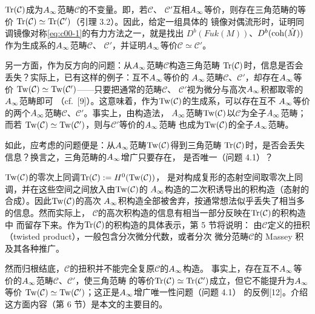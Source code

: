 $\operatorname{Tr}(\mathcal{C})$成为$A_{\infty}$范畴$\mathcal{C}$的不变量。即，若$\mathcal{C}$、
$\mathcal{C}'$互相$A_{\infty}$等价，则存在三角范畴的等价
$\operatorname{Tr}(\mathcal{C})\simeq\operatorname{Tr}(\mathcal{C}')$（引理 3.2）。因此，给定一组具体的
镜像对偶流形时，证明同调镜像对称\eqref{eq:c00-1}的有力方法之一，就是找出
$D^{b}(Fuk(M))$、$D^{b}(\operatorname{coh}(\hat{M}))$作为生成系的$A_{\infty}$范畴$\mathcal{C}$、
$\mathcal{C}'$，并证明$A_{\infty}$等价$\mathcal{C}\simeq\mathcal{C}'$。

另一方面，作为反方向的问题：从$A_{\infty}$范畴$\mathcal{C}$构造三角范畴
$\operatorname{Tr}(\mathcal{C})$时，信息是否会丢失？实际上，已有这样的例子：互不$A_{\infty}$等价的
$A_{\infty}$范畴$\mathcal{C}$、$\mathcal{C}'$，却存在$A_{\infty}$等价
$\operatorname{Tw}(\mathcal{C})\simeq\operatorname{Tw}(\mathcal{C}')$——只要把通常的范畴$\mathcal{C}$、
$\mathcal{C}'$视为微分与高次$A_{\infty}$积都取零的$A_{\infty}$范畴即可
（cf.\ [9]）。这意味着，作为$\operatorname{Tw}(\mathcal{C})$的生成系，可以存在互不
$A_{\infty}$等价的两个$A_{\infty}$范畴$\mathcal{C}$、$\mathcal{C}'$。事实上，由构造法，
$A_{\infty}$范畴$\operatorname{Tw}(\mathcal{C})$以$\mathcal{C}$为全子$A_{\infty}$范畴；而若
$\operatorname{Tw}(\mathcal{C})\simeq\operatorname{Tw}(\mathcal{C}')$，则与$\mathcal{C}'$等价的$A_{\infty}$范畴
也成为$\operatorname{Tw}(\mathcal{C})$的全子$A_{\infty}$范畴。


如此，应考虑的问题便是：从$A_{\infty}$范畴$\operatorname{Tw}(\mathcal{C})$得到三角范畴
$\operatorname{Tr}(\mathcal{C})$时，是否会丢失信息？换言之，三角范畴的$A_{\infty}$增广只要存在，
是否唯一（问题 4.1）？

$\operatorname{Tw}(\mathcal{C})$的零次上同调$\operatorname{Tr}(\mathcal{C}):=H^{0}(\operatorname{Tw}(\mathcal{C}))$，
是对构成复形的态射空间取零次上同调，并在这些空间之间放入由$\operatorname{Tw}(\mathcal{C})$的
$A_{\infty}$构造的二次积诱导出的积构造（态射的合成）。因此$\operatorname{Tw}(\mathcal{C})$的高次
$A_{\infty}$积构造全部被舍弃，按通常想法似乎丢失了相当多的信息。然而实际上，
$\mathcal{C}$的高次积构造的信息有相当一部分反映在$\operatorname{Tr}(\mathcal{C})$的积构造中
而留存下来。作为$\operatorname{Tr}(\mathcal{C})$的积构造的具体表示，第 5 节将说明：
由$\mathcal{C}$定义的扭积（twisted product），一般包含分次微分代数，或者分次
微分范畴$\mathcal{C}$的 Massey 积及其各种推广。

然而归根结底，$\mathcal{C}$的扭积并不能完全复原$\mathcal{C}$的$A_{\infty}$构造。
事实上，存在互不$A_{\infty}$等价的$A_{\infty}$范畴$\mathcal{C}$、$\mathcal{C}'$，使三角范畴
的等价$\operatorname{Tr}(\mathcal{C})\simeq\operatorname{Tr}(\mathcal{C}')$成立，但它不能提升为$A_{\infty}$等价
$\operatorname{Tw}(\mathcal{C})\simeq\operatorname{Tw}(\mathcal{C}')$；这正是$A_{\infty}$增广唯一性问题（问题 4.1）
的反例[12]。介绍这方面内容（第 6 节）是本文的主要目的。

